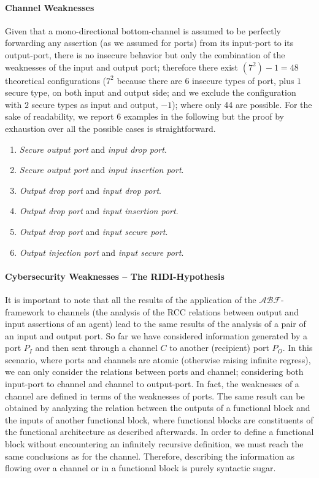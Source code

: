 \documentclass[conference]{IEEEtran}
\newcommand{\assertionRegion}{\mathcal{A}}
\newcommand{\beliefRegion}{\mathcal{B}}
\newcommand{\factRegion}{\mathcal{F}}
\newcommand{\abftheory}{\assertionRegion\beliefRegion\factRegion}
\newcommand{\Rcc}[2]{rcc(#1,#2)}
\begin{document}
\paragraph{Channel Weaknesses}
Given that a mono-directional bottom-channel is assumed to be perfectly
forwarding any assertion (as we assumed for ports) from its input-port to its
output-port, there is no insecure behavior but only the combination of the
weaknesses of the input and output port; therefore there exist $(7^2)-1=48$
theoretical configurations ($7^2$ because there are $6$ insecure types of port,
plus $1$ secure type, on both input and output side; and we exclude the
configuration with $2$ secure types as input and output, $-1$); where only 44
are possible. For the sake of readability, we report 6 examples in the
following but the proof by exhaustion over all the possible cases is
straightforward.

\begin{enumerate}[start=6, label={W\arabic*)}]
	\item \emph{Secure output port} and \emph{input drop port}.
	\item \emph{Secure output port} and \emph{input insertion port}.
	\item \emph{Output drop port} and \emph{input drop port}.
	\item \emph{Output drop port} and \emph{input insertion port}.
	\item \emph{Output drop port} and \emph{input secure port}.
	\item \emph{Output injection port} and \emph{input secure port}.
\end{enumerate}

\paragraph{Cybersecurity Weaknesses -- The RIDI-Hypothesis} 
It is important to note that all the results of the application of the
$\abftheory$-framework to channels (the analysis of the RCC relations
between output and input assertions of an agent)
lead to the same results of the
analysis of a pair of an input and output port.
So far we have
considered information generated by a port $P_I$ and then sent through a
channel $C$ to another (recipient) port $P_O$. In this scenario, where ports and
channels are atomic (otherwise raising infinite regress), we can only
consider the relations between ports and channel; considering both input-port
to channel and channel to output-port.  In fact, the weaknesses of a channel
are defined in terms of the weaknesses of ports.  
The same result can be obtained by analyzing the relation between the outputs
of a functional block and the inputs of another functional block, where
functional blocks are constituents of the functional architecture as described
afterwards.  In order to define a functional block without encountering an
infinitely recursive definition, we must reach the same conclusions as for the
channel. Therefore, describing the information as flowing over a channel or in
a functional block is purely syntactic sugar.
\end{document}
